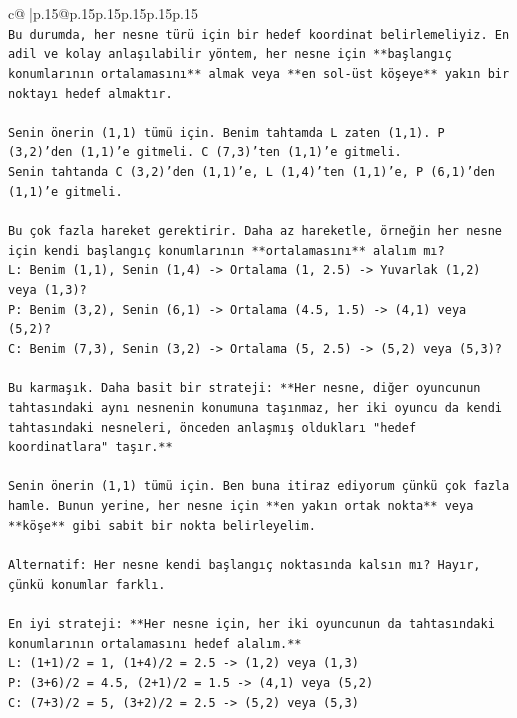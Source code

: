 \documentclass{article}
\begin{document}
{\begin{supertabular}{c@{$\;$}|p{.15\linewidth}@{}p{.15\linewidth}p{.15\linewidth}p{.15\linewidth}p{.15\linewidth}p{.15\linewidth}}
{{{\\ 
\texttt{Bu durumda, her nesne türü için bir hedef koordinat belirlemeliyiz. En adil ve kolay anlaşılabilir yöntem, her nesne için **başlangıç konumlarının ortalamasını** almak veya **en sol{-}üst köşeye** yakın bir noktayı hedef almaktır.} \\
\\ 
\texttt{Senin önerin (1,1) tümü için. Benim tahtamda L zaten (1,1). P (3,2)'den (1,1)'e gitmeli. C (7,3)'ten (1,1)'e gitmeli.} \\
\texttt{Senin tahtanda C (3,2)'den (1,1)'e, L (1,4)'ten (1,1)'e, P (6,1)'den (1,1)'e gitmeli.} \\
\\ 
\texttt{Bu çok fazla hareket gerektirir. Daha az hareketle, örneğin her nesne için kendi başlangıç konumlarının **ortalamasını** alalım mı?} \\
\texttt{L: Benim (1,1), Senin (1,4) {-}> Ortalama (1, 2.5) {-}> Yuvarlak (1,2) veya (1,3)?} \\
\texttt{P: Benim (3,2), Senin (6,1) {-}> Ortalama (4.5, 1.5) {-}> (4,1) veya (5,2)?} \\
\texttt{C: Benim (7,3), Senin (3,2) {-}> Ortalama (5, 2.5) {-}> (5,2) veya (5,3)?} \\
\\ 
\texttt{Bu karmaşık. Daha basit bir strateji: **Her nesne, diğer oyuncunun tahtasındaki aynı nesnenin konumuna taşınmaz, her iki oyuncu da kendi tahtasındaki nesneleri, önceden anlaşmış oldukları "hedef koordinatlara" taşır.**} \\
\\ 
\texttt{Senin önerin (1,1) tümü için. Ben buna itiraz ediyorum çünkü çok fazla hamle. Bunun yerine, her nesne için **en yakın ortak nokta** veya **köşe** gibi sabit bir nokta belirleyelim.} \\
\\ 
\texttt{Alternatif: Her nesne kendi başlangıç noktasında kalsın mı? Hayır, çünkü konumlar farklı.} \\
\\ 
\texttt{En iyi strateji: **Her nesne için, her iki oyuncunun da tahtasındaki konumlarının ortalamasını hedef alalım.**} \\
\texttt{L: (1+1)/2 = 1, (1+4)/2 = 2.5 {-}> (1,2) veya (1,3)} \\
\texttt{P: (3+6)/2 = 4.5, (2+1)/2 = 1.5 {-}> (4,1) veya (5,2)} \\
\texttt{C: (7+3)/2 = 5, (3+2)/2 = 2.5 {-}> (5,2) veya (5,3)} \\
\\ 
}}}
\end{supertabular}}
\end{document}
